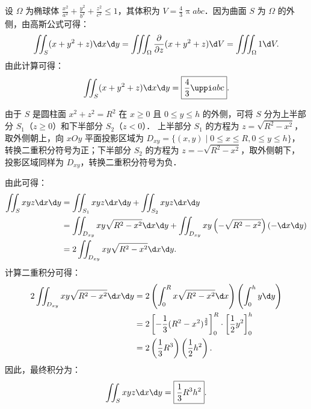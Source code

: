 \begin{solution}

    设 $\Omega$ 为椭球体 $\frac{x^2}{a^2} + \frac{y^2}{b^2} + \frac{z^2}{c^2} \le 1$，其体积为 $V = \frac{4}{3} \uppi a b c$．因为曲面 $S$ 为 $\Omega$ 的外侧，由高斯公式可得：
    \begin{equation}
        \label{eq:ellipsoid-1}
        \iint_{S} (x + y^2 + z) \d x \d y = \iiint_{\Omega} \frac{\partial}{\partial z} (x + y^2 + z) \d V = \iiint_{\Omega} 1 \d V.
    \end{equation}
    由此计算可得：
    \begin{equation}
        \label{eq:ellipsoid-2}
        \iint_{S} (x + y^2 + z) \d x \d y = \boxed{\frac{4}{3} \uppi a b c}.
    \end{equation}


    由于 $S$ 是圆柱面 $x^2 + z^2 = R^2$ 在 $x \ge 0$ 且 $0 \le y \le h$ 的外侧，可将 $S$ 分为上半部分 $S_1$（$z \ge 0$）和下半部分 $S_2$（$z < 0$）．
    上半部分 $S_1$ 的方程为 $z = \sqrt{R^2 - x^2}$，取外侧朝上，向 $xOy$ 平面投影区域为 $D_{xy} = \{ (x,y) \mid 0 \le x \le R, 0 \le y \le h \}$，转换二重积分符号为正；下半部分 $S_2$ 的方程为 $z = -\sqrt{R^2 - x^2}$，取外侧朝下，投影区域同样为 $D_{xy}$，转换二重积分符号为负．

    由此可得：
    \begin{equation}
        \label{eq:cylinder-1}
        \begin{aligned}
            \iint_{S} x y z \d x \d y & = \iint_{S_1} x y z \d x \d y + \iint_{S_2} x y z \d x \d y                                                         \\
                                      & = \iint_{D_{xy}} x y \sqrt{R^2 - x^2} \d x \d y + \iint_{D_{xy}} x y \left( -\sqrt{R^2 - x^2} \right) (- \d x \d y) \\
                                      & = 2 \iint_{D_{xy}} x y \sqrt{R^2 - x^2} \d x \d y.
        \end{aligned}
    \end{equation}
    计算二重积分可得：
    \begin{equation}
        \label{eq:cylinder-2}
        \begin{aligned}
            2 \iint_{D_{xy}} x y \sqrt{R^2 - x^2} \d x \d y & = 2 \left( \int_0^R x \sqrt{R^2 - x^2} \d x \right) \left( \int_0^h y \d y \right)                     \\
                                                            & = 2 \left[ -\frac{1}{3} (R^2 - x^2)^{\frac{3}{2}} \right]_0^R \cdot \left[ \frac{1}{2} y^2 \right]_0^h \\
                                                            & = 2 \left( \frac{1}{3} R^3 \right) \left( \frac{1}{2} h^2 \right).
        \end{aligned}
    \end{equation}
    因此，最终积分为：
    \begin{equation}
        \label{eq:cylinder-3}
        \iint_{S} x y z \d x \d y = \boxed{\frac{1}{3} R^3 h^2}.
    \end{equation}


\end{solution}
